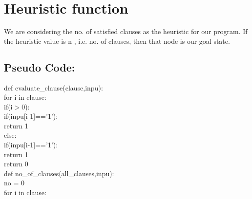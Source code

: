 \documentclass{article}
\begin{document}
\section{Heuristic function}
\vspace{10pt}
We are considering the no. of satisfied clauses as the heuristic for our program.
If the heuristic value is n , i.e. no. of clauses, then that node is our goal state.
\subsection*{Pseudo Code:}
\vspace{5pt}
    def evaluate\_clause(clause,inpu):
        \vspace{2pt}
        \\ \hspace*{20pt}for i in clause:
        \vspace{2pt}
        \\ \hspace*{30pt}if(i$>$0):
        \vspace{2pt}
        \\ \hspace*{50pt} if(inpu[i-1]=='1'):
        \vspace{2pt}
        \\ \hspace*{70pt} return 1
        \vspace{2pt}
        \\ \hspace*{30pt} else:
        \vspace{2pt}
        \\ \hspace*{50pt} if(inpu[i-1]=='1'):
        \vspace{2pt}
        \\ \hspace*{70pt} return 1
        \vspace{2pt}
        \\ \hspace*{20pt} return 0
\vspace{15pt}
        \\def no\_of\_clauses(all\_clauses,inpu):
            \vspace{2pt}
            \\ \hspace*{20pt}no = 0
            \vspace{2pt}
            \\ \hspace*{20pt}for i in clause:
\end{document}

